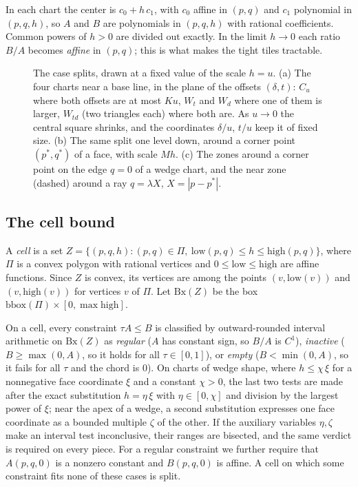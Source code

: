 \documentclass[11pt]{amsart}
\theoremstyle{definition}
\theoremstyle{remark}
\newcommand{\low}{\mathrm{low}}
\newcommand{\high}{\mathrm{high}}
\begin{document}
In each chart the center is $c_0+h\,c_1$, with $c_0$ affine in $(p,q)$ and $c_1$
polynomial in $(p,q,h)$, so $A$ and $B$ are polynomials in $(p,q,h)$ with rational coefficients. Common powers of
$h>0$ are divided out exactly. In the limit $h\to0$ each ratio $B/A$ becomes \emph{affine} in $(p,q)$; this is what
makes the tight tiles tractable.

\begin{figure}[ht]
\centering
\caption{The case splits, drawn at a fixed value of the scale $h=u$. (a) The four charts near a base line, in the
plane of the offsets $(\delta,t)$: $C_u$ where both offsets are at most $Ku$, $W_t$ and $W_d$ where one of them is
larger, $W_{td}$ (two triangles each) where both are. As $u\to0$ the central square shrinks, and the coordinates
$\delta/u$, $t/u$ keep it of fixed size. (b) The same split one level down, around a corner point $(p^*,q^*)$ of a
face, with scale $Mh$. (c) The zones around a corner point on the edge $q=0$ of a wedge chart, and the near zone
(dashed) around a ray $q=\lambda X$, $X=|p-p^*|$.}
\label{fig:zones}
\end{figure}

\subsection{The cell bound}
A \emph{cell} is a set $Z=\{(p,q,h):(p,q)\in\Pi,\ \low(p,q)\le h\le\high(p,q)\}$, where $\Pi$ is a convex polygon
with rational vertices and $0\le\low\le\high$ are affine functions. Since $Z$ is convex, its vertices are among the
points $(v,\low(v))$ and $(v,\high(v))$ for vertices $v$ of $\Pi$. Let $\mathrm{Bx}(Z)$ be the box
$\mathrm{bbox}(\Pi)\times[0,\max\high]$.

On a cell, every constraint $\tau A\le B$ is classified by outward-rounded interval arithmetic on $\mathrm{Bx}(Z)$
as \emph{regular} ($A$ has constant sign, so $B/A$ is $C^1$), \emph{inactive} ($B\ge\max(0,A)$, so it holds for all
$\tau\in[0,1]$), or \emph{empty} ($B<\min(0,A)$, so it fails for all $\tau$ and the chord is $0$). On charts of wedge
shape, where $h\le\chi\,\xi$ for a nonnegative face coordinate $\xi$ and a constant $\chi>0$, the last two
tests are made after the exact substitution $h=\eta\,\xi$ with $\eta\in[0,\chi]$ and division by the largest
power of $\xi$; near the apex of a wedge, a second substitution expresses one face coordinate as a bounded multiple
$\zeta$ of the other. If the auxiliary variables $\eta,\zeta$ make an interval test inconclusive, their ranges are
bisected, and the same verdict is required on every piece. For a regular constraint we further require that
$A(p,q,0)$ is a nonzero constant and $B(p,q,0)$ is affine. A cell on which some constraint fits none of these cases
is split.
\end{document}
